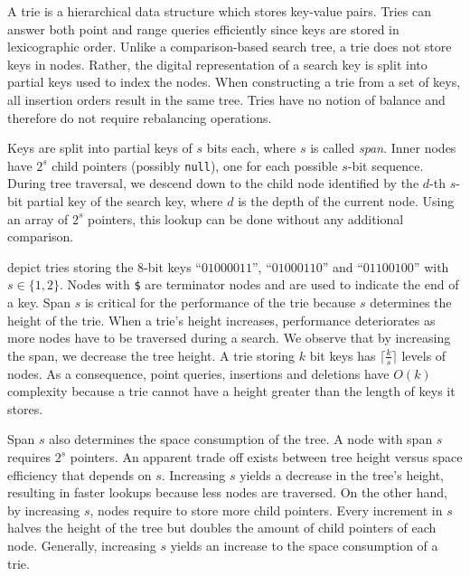 \documentclass[abstracton,12pt]{scrartcl}
\theoremstyle{definition}
\begin{document}
A trie \cite{fredkin1960trie} is a hierarchical data structure which
stores key-value pairs. Tries can answer both point and range queries 
efficiently since keys are stored in lexicographic order.
Unlike a comparison-based search tree, a trie does not store keys in nodes.
Rather, the digital representation of a search key is split into partial
keys used to index the nodes. When 
constructing a trie from a set of keys, all insertion orders result in the 
same tree. Tries have no notion of balance and therefore do not require 
rebalancing operations.

Keys are split into partial keys of $s$ bits each, where $s$ is called 
\textit{span}. Inner nodes have  $2^s$ child pointers 
(possibly \texttt{null}), one for each possible $s$-bit sequence. During tree
traversal, we descend down to the child node identified by the $d$-th
$s$-bit partial key of the search key, where $d$ is the depth of the current 
node.  Using an array of $2^s$  pointers, this lookup can be done without any 
additional comparison. 

 depict tries storing the 
8-bit keys ``$01000011$'', ``$01000110$'' and ``$01100100$'' with 
$s \in \{1,2\}$. Nodes with \texttt{\$} are terminator nodes and are used
to indicate the end of a key. Span $s$ is critical for the performance of the 
trie because $s$ determines the height of the trie. When a trie's height
increases, performance deteriorates as more nodes have to be traversed during
a search. We observe that by increasing the span, we decrease the tree height. 
A trie storing $k$ bit keys has $\lceil \frac{k}{s} \rceil$ levels of nodes.
As a consequence, point queries, insertions and deletions have 
$O(k)$ complexity because a trie cannot have a height greater than the length
of keys it stores.

Span $s$ also determines the space consumption of the tree.
A node with span $s$ requires $2^s$ pointers. 
An apparent trade off exists between tree height versus space efficiency that
depends on $s$. Increasing $s$ yields a decrease in the tree's height, 
resulting in faster lookups because less nodes are traversed. On the other
hand, by increasing $s$, nodes require to store more child pointers. Every
increment in $s$ halves the height of the tree but doubles the amount of 
child pointers of each node. Generally, increasing $s$ yields an increase to
the space consumption of a trie.
\end{document}
